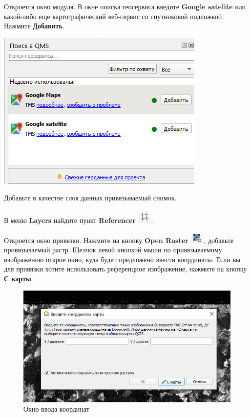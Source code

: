 \documentclass[
  12pt,
]{book}
\begin{document}
Откроется окно модуля. В окне поиска геосервиса введите \textbf{Google satelite} или какой-либо еще картографический веб-сервис со спутниковой подложкой. Нажмите \textbf{Добавить}.

\includegraphics{images/Ref02/QMS.png}

Добавьте в качестве слоя данных привязываемый снимок.

В меню \textbf{Layers} найдите пункт \textbf{Referencer} \includegraphics{images/Ref02/Reference_button.png}.

Откроется окно привязки. Нажмите на кнопку \textbf{Open Raster} \includegraphics{images/Ref02/Open_rastr.png}, добавьте привязываемый растр. Щелчок левой кнопкой мыши по привязываемому изображению открое окно, куда будет предложено ввести координаты. Если вы для привязки хотите использовать референцное изображение, нажмите на кнопку \textbf{С карты}.

\begin{figure}
\centering
\includegraphics{images/Ref02/Input_coordinates.png}
\caption{Окно ввода координат}
\end{figure}
\end{document}
